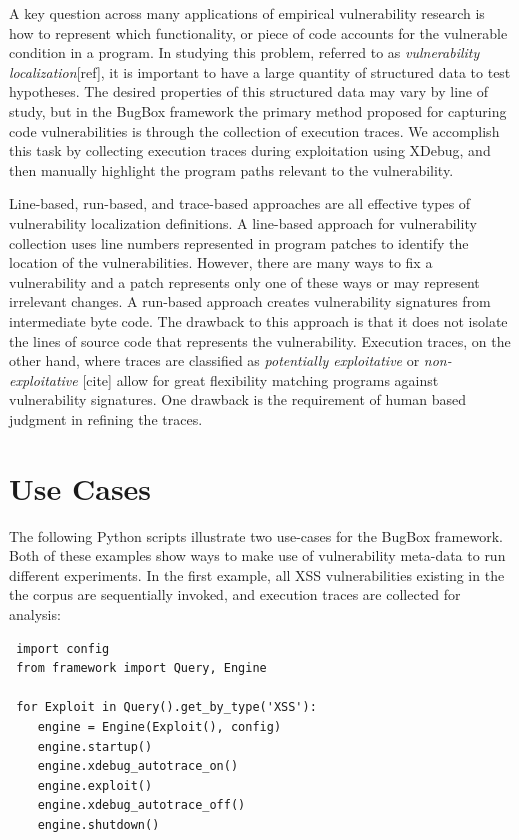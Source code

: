 \documentclass[letterpaper,twocolumn,10pt]{article}
\begin{document}
A key question across many applications of empirical vulnerability research is how to represent which functionality, or piece of code accounts for the vulnerable condition in a program. In studying this problem, referred to as \emph{vulnerability localization}[ref], it is important to have a large quantity of structured data to test hypotheses. The desired properties of this structured data may vary by line of study, but in the BugBox framework the primary method proposed for capturing code vulnerabilities is through the collection of execution traces. We accomplish this task by collecting execution traces during exploitation using XDebug, and then manually highlight the program paths relevant to the vulnerability.\par 
Line-based, run-based, and trace-based approaches are all effective types of vulnerability localization definitions. A line-based\cite{4630094} approach for vulnerability collection uses line numbers represented in program patches to identify the location of the vulnerabilities.  However, there are many ways to fix a vulnerability and a patch represents only one of these ways or may represent irrelevant changes.  A run-based\cite{Song:2008:BNA:1496255.1496257} approach creates vulnerability signatures from intermediate byte code. The drawback to this approach is that it does not isolate the lines of source code that represents the vulnerability. Execution traces, on the other hand, where traces are classified as \emph{potentially exploitative} or \emph{non-exploitative} [cite] allow for great flexibility matching programs against vulnerability signatures. One drawback is the requirement of human based judgment in refining the traces.   

\section{Use Cases}

The following Python scripts illustrate two use-cases for the BugBox framework. Both of these examples show ways to make use of vulnerability meta-data to run different experiments. In the first example, all XSS vulnerabilities existing in the the corpus are sequentially invoked, and execution traces are collected for analysis:

\begin{minipage}{\textwidth}
{\tt \footnotesize

\begin{lstlisting}
 import config
 from framework import Query, Engine
 
 for Exploit in Query().get_by_type('XSS'):
    engine = Engine(Exploit(), config)
    engine.startup()
    engine.xdebug_autotrace_on()
    engine.exploit()
    engine.xdebug_autotrace_off()
    engine.shutdown()
\end{lstlisting}
}
\end{minipage}
\end{document}
